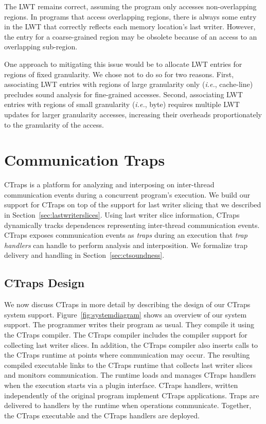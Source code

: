 \documentclass[preprint,9pt]{sigplanconf}
\newcommand{\ctraps}{CTraps\xspace}
\newcommand{\lwt}{LWT\xspace}
\begin{document}
The \lwt remains correct, assuming the program only accesses non-overlapping
regions.  In programs that access overlapping regions, there is always some
entry in the \lwt that correctly reflects each memory location's last writer.
However, the entry for a coarse-grained region may be obsolete because of an
access to an overlapping sub-region.

One approach to mitigating this issue would be to allocate \lwt entries for
regions of fixed granularity.  We chose not to do so for two reasons.  First,
associating \lwt entries with regions of  large granularity only ({\em i.e.},
cache-line) precludes sound analysis for fine-grained accesses.  Second,
associating \lwt entries with regions of small granularity ({\em i.e.}, byte)
requires multiple \lwt updates for larger granularity accesses, increasing
their overheads proportionately to the granularity of the access.





\section{Communication Traps}
\label{sec:ctraps}

\ctraps is a platform for analyzing and interposing on inter-thread
communication events during a concurrent program's execution.  We build our
support for \ctraps on top of the support for last writer slicing that we
described in Section~\ref{sec:lastwriterslices}.  Using last writer slice
information, \ctraps dynamically tracks dependences representing inter-thread
communication events. \ctraps exposes communication events as {\em traps}
during an execution that {\em trap handlers} can handle to perform analysis
and interposition.  We formalize trap delivery and handling in
Section~\ref{sec:ctsoundness}.

\subsection{\ctraps Design}

We now discuss \ctraps in more detail by describing the design of our \ctraps
system support.  Figure~\ref{fig:systemdiagram} shows an overview of our system
support.  The programmer writes their program as usual.  They compile it using
the \ctraps compiler. The \ctraps compiler includes the compiler support for
collecting last writer slices.  In addition, the \ctraps compiler also inserts
calls to the \ctraps runtime at points where communication may occur.  The
resulting compiled executable links to the \ctraps runtime that collects last
writer slices and monitors communication.  The runtime loads and manages \ctraps
handlers when the execution starts via a plugin interface.  \ctraps handlers,
written independently of the original program implement \ctraps applications.
Traps are delivered to handlers by the runtime when operations communicate.
Together, the \ctraps executable and the \ctraps handlers are deployed.
\end{document}
